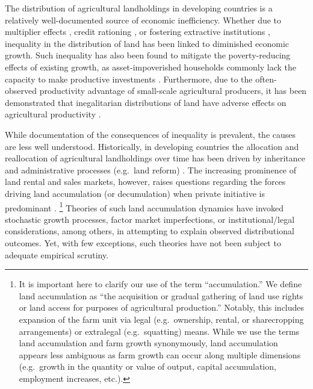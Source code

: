 \documentclass[english]{article}
\begin{document}
The distribution of agricultural landholdings in developing countries is a 
relatively well-documented source of economic inefficiency.
Whether due to multiplier effects \citep{mellor1976}, credit rationing 
\citep{deininger1998}, or fostering extractive institutions 
\citep{acemoglu2002}, inequality in the distribution of land has been linked 
to diminished economic growth.
Such inequality has also been found to mitigate the poverty-reducing effects 
of existing growth, as asset-impoverished households commonly lack the 
capacity to make productive investments 
\citep{deininger1998, ravallion2002, lipton2009}.
Furthermore, due to the often-observed productivity advantage of small-scale 
agricultural producers, it has been demonstrated that inegalitarian distributions 
of land have adverse effects on agricultural productivity  
\citep{eswaran1986, vollrath2007, lipton2009}.

While documentation of the consequences of inequality is prevalent, the causes 
are less well understood.
Historically, in developing countries the allocation and reallocation of 
agricultural landholdings over time has been driven by inheritance and 
administrative processes (e.g.\ land reform) 
\citep{binswanger1995, deininger2001, lipton2009}.
The increasing prominence of land rental and sales markets, however, raises 
questions regarding the forces driving land accumulation (or decumulation) 
when private initiative is predominant
\citep{boucher2005, deininger2008b, holden2009}.%
\footnote{It is important here to clarify our use of the term ``accumulation.''
We define land accumulation as ``the acquisition or gradual gathering of land 
use rights or land access for purposes of agricultural production.''  
Notably, this includes expansion of the farm unit via legal (e.g.\ ownership, 
rental, or sharecropping arrangements) or extralegal (e.g.\ squatting) means.
While we use the terms land accumulation and farm growth synonymously, 
land accumulation appears less ambiguous as farm growth can occur along
multiple dimensions (e.g.\ growth in the quantity or value of output, capital
accumulation, employment increases, etc.).}
Theories of such land accumulation dynamics have invoked stochastic growth 
processes, factor market imperfections, or institutional/legal considerations, 
among others, in attempting to explain observed distributional outcomes.
Yet, with few exceptions, such theories have not been subject to adequate
empirical scrutiny.
\end{document}
